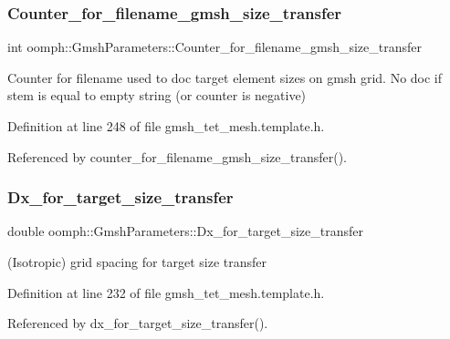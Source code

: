 \subsubsection{\texorpdfstring{Counter\+\_\+for\+\_\+filename\+\_\+gmsh\+\_\+size\+\_\+transfer}{Counter\_for\_filename\_gmsh\_size\_transfer}}
{\footnotesize\ttfamily int oomph\+::\+Gmsh\+Parameters\+::\+Counter\+\_\+for\+\_\+filename\+\_\+gmsh\+\_\+size\+\_\+transfer\hspace{0.3cm}{\ttfamily [private]}}



Counter for filename used to doc target element sizes on gmsh grid. No doc if stem is equal to empty string (or counter is negative) 



Definition at line 248 of file gmsh\+\_\+tet\+\_\+mesh.\+template.\+h.



Referenced by counter\+\_\+for\+\_\+filename\+\_\+gmsh\+\_\+size\+\_\+transfer().

\mbox{\label{classoomph_1_1GmshParameters_a0c4d7e327d44f9514eb0ac0894f6f9d9}} 
\subsubsection{\texorpdfstring{Dx\+\_\+for\+\_\+target\+\_\+size\+\_\+transfer}{Dx\_for\_target\_size\_transfer}}
{\footnotesize\ttfamily double oomph\+::\+Gmsh\+Parameters\+::\+Dx\+\_\+for\+\_\+target\+\_\+size\+\_\+transfer\hspace{0.3cm}{\ttfamily [private]}}



(Isotropic) grid spacing for target size transfer 



Definition at line 232 of file gmsh\+\_\+tet\+\_\+mesh.\+template.\+h.



Referenced by dx\+\_\+for\+\_\+target\+\_\+size\+\_\+transfer().

\mbox{\label{classoomph_1_1GmshParameters_aa7993da33a0468681e5f661ac5b00bfb}} 
